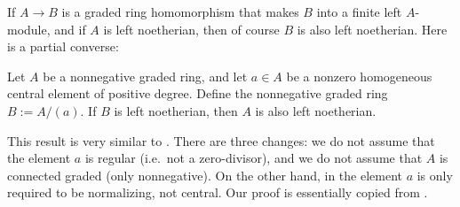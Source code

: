 If $A \to B$ is a graded ring homomorphism that makes $B$ into a finite left 
$A$-module, and if $A$ is left noetherian, then of course $B$ is also left 
noetherian. Here is a partial converse: 

\begin{thm} \label{thm:4240}
Let $A$ be a nonnegative graded ring, and let $a \in A$ be a nonzero 
homogeneous central element of positive degree. Define the nonnegative graded 
ring $B := A / (a)$. If $B$ is left noetherian, then $A$ is also left 
noetherian. 
\end{thm}

This result is very similar to \cite[Lemma 8.2]{ATV}. There are 
three changes: we do not assume that the element $a$ is regular (i.e.\ not a 
zero-divisor), and we do not assume that $A$ is connected graded (only 
nonnegative). On the other hand, in \cite{ATV} the element $a$ is only 
required to be normalizing, not central. Our proof is essentially copied from 
\cite{ATV}. 

